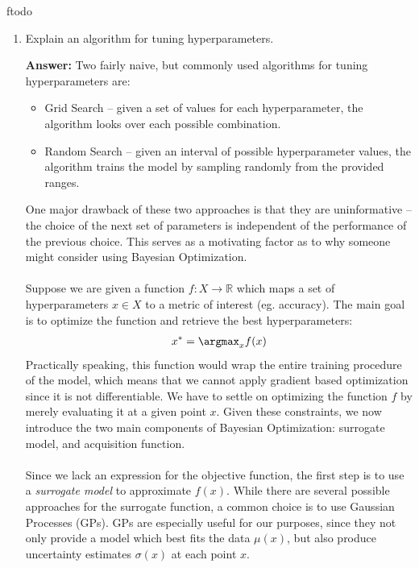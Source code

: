 ƒtodo\documentclass{article}
\newenvironment{QandA}{\begin{enumerate}[label=\arabic*.]}{\end{enumerate}}
\newenvironment{InnerQandA}{\begin{enumerate}[label=\roman*.]}{\end{enumerate}}
\newenvironment{answer}{\par\normalfont \textbf{Answer:}}{}
\newcommand{\R}{\mathbb{R}}
\begin{document}
\begin{QandA}
\begin{InnerQandA}
        \item Explain an algorithm for tuning hyperparameters. 
        \begin{answer}
            Two fairly naive, but commonly used algorithms for tuning hyperparameters are:
            \begin{itemize}
                \item Grid Search -- given a set of values for each hyperparameter, the algorithm looks over each possible combination.
                \item Random Search -- given an interval of possible hyperparameter values, the algorithm trains the model by sampling randomly from the provided ranges.
            \end{itemize}
            One major drawback of these two approaches is that they are uninformative -- the choice of the next set of parameters is independent of the performance of the previous choice. This serves as a motivating factor as to why someone might consider using Bayesian Optimization. \\\\
            Suppose we are given a function $f: X \rightarrow \R$ which maps a set of hyperparameters $x \in X$ to a metric of interest (eg. accuracy). The main goal is to optimize the function and retrieve the best hyperparameters:
            \begin{align*}
                x^* = \argmax_x f(x)
            \end{align*}
            Practically speaking, this function would wrap the entire training procedure of the model, which means that we cannot apply gradient based optimization since it is not differentiable. We have to settle on optimizing the function $f$ by merely evaluating it at a given point $x$. Given these constraints, we now introduce the two main components of Bayesian Optimization: surrogate model, and acquisition function. \\\\
            Since we lack an expression for the objective function, the first step is to use a \textit{surrogate model} to approximate $f(x)$. While there are several possible approaches for the surrogate function, a common choice is to use Gaussian Processes (GPs). 
            GPs are especially useful for our purposes, since they not only provide a model which best fits the data $\mu(x)$, but also produce uncertainty estimates $\sigma(x)$ at each point $x$. \\\\

\end{answer}
\end{InnerQandA}
\end{QandA}
\end{document}
